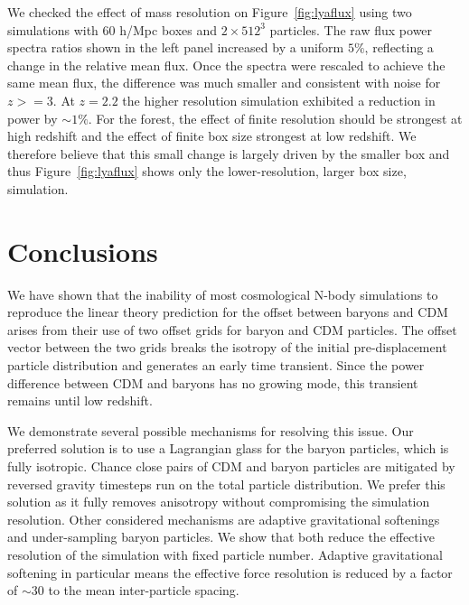 \documentclass[a4paper,11pt]{article}
\newcommand{\Lya}{Lyman-$\alpha$}
\begin{document}

We checked the effect of mass resolution on Figure~\ref{fig:lyaflux} using two simulations with $60$ h/Mpc boxes and $2\times 512^3$ particles. The raw flux power spectra ratios shown in the left panel increased by a uniform $5\%$, reflecting a change in the relative mean flux. Once the spectra were rescaled to achieve the same mean flux, the difference was much smaller and consistent with noise for $z >= 3$. At $z=2.2$ the higher resolution simulation exhibited a reduction in power by $\sim 1\%$. For the forest, the effect of finite resolution should be strongest at high redshift \cite{Bolton:2009} and the effect of finite box size strongest at low redshift. We therefore believe that this small change is largely driven by the smaller box and thus Figure~\ref{fig:lyaflux} shows only the lower-resolution, larger box size, simulation.

\section{Conclusions}
\label{sec:conclude}

We have shown that the inability of most cosmological N-body simulations to reproduce the linear theory prediction for the offset between baryons and CDM arises from their use of two offset grids for baryon and CDM particles. The offset vector between the two grids breaks the isotropy of the initial pre-displacement particle distribution and generates an early time transient. Since the power difference between CDM and baryons has no growing mode, this transient remains until low redshift.

We demonstrate several possible mechanisms for resolving this issue. Our preferred solution is to use a Lagrangian glass for the baryon particles, which is fully isotropic. Chance close pairs of CDM and baryon particles are mitigated by reversed gravity timesteps run on the total particle distribution. We prefer this solution as it fully removes anisotropy without compromising the simulation resolution. Other considered mechanisms are adaptive gravitational softenings and under-sampling baryon particles. We show that both reduce the effective resolution of the simulation with fixed particle number. Adaptive gravitational softening in particular means the effective force resolution is reduced by a factor of $\sim 30$ to the mean inter-particle spacing.
\end{document}
